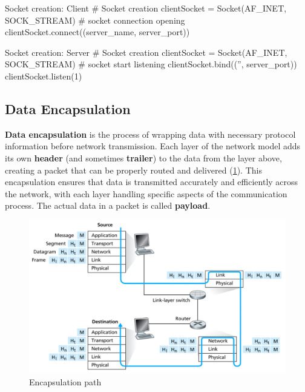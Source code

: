 \begin{neonlisting}[language=Python]{Socket creation: Client}
# Socket creation
clientSocket = Socket(AF_INET, SOCK_STREAM)
# socket connection opening
clientSocket.connect((server_name, server_port))
\end{neonlisting}

\begin{neonlisting}[language=Python]{Socket creation: Server}
# Socket creation
clientSocket = Socket(AF_INET, SOCK_STREAM)
# socket start listening
clientSocket.bind(('', server_port))
clientSocket.listen(1)
\end{neonlisting}

\subsection{Data Encapsulation} \label{encapsulation}

\textbf{Data encapsulation} is the process of wrapping data with necessary protocol information before network transmission. Each layer of the network model adds its own \textbf{header} (and sometimes \textbf{trailer}) to the data from the layer above, creating a packet that can be properly routed and delivered (\cref{fig:encapsulation}). This encapsulation ensures that data is transmitted accurately and efficiently across the network, with each layer handling specific aspects of the communication process. The actual data in a packet is called \textbf{payload}.

\begin{figure}[H]
    \centering
    \includegraphics[scale=0.4]{assets/encapsulation.png}
    \caption{Encapsulation path} \label{fig:encapsulation}
\end{figure}

